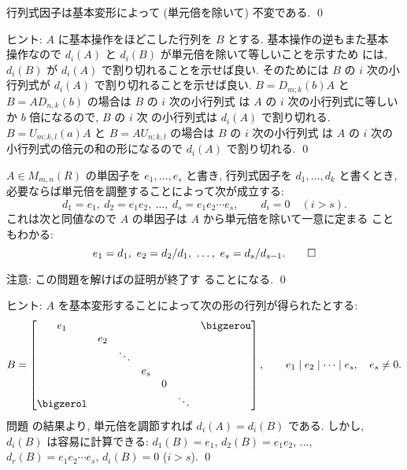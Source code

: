 \documentclass[12pt,twoside]{jarticle}
\begin{document}
\begin{question}[行列式因子の基本変形による不変性]
\label{q:invariance-det-div}
  行列式因子は基本変形によって (単元倍を除いて) 不変である.
  \qed
\end{question}

\noindent
ヒント: $A$ に基本操作をほどこした行列を $B$ とする. 基本操作の逆もまた基本
操作なので $d_i(A)$ と $d_i(B)$ が単元倍を除いて等しいことを示すため
には, $d_i(B)$ が $d_i(A)$ で割り切れることを示せば良い.  
そのためには $B$ の $i$ 次の小行列式が $d_i(A)$ で割り切れることを示せば良い.
$B=D_{m;k}(b)A$ と $B=AD_{n,k}(b)$ の場合は $B$ の $i$ 次の小行列式
は $A$ の $i$ 次の小行列式に等しいか $b$ 倍になるので, $B$ の $i$ 次
の小行列式は $d_i(A)$ で割り切れる.
$B=U_{m;k,l}(a)A$ と $B=AU_{n;k,l}$ の場合は $B$ の $i$ 次の小行列式
は $A$ の $i$ 次の小行列式の倍元の和の形になるので $d_i(A)$ で割り切れる.
\qed


\begin{question}[単因子と行列式因子の関係]
\label{q:elem-div-det-div}
  $A\in M_{m,n}(R)$ の単因子を $e_1,\dots,e_s$ と書き, 
  行列式因子を $d_1,\dots,d_k$ と書くとき, 
  必要ならば単元倍を調整することによって次が成立する:
  \begin{equation*}
    d_1 = e_1,\ d_2 = e_1e_2,\ \dots,\ d_s = e_1e_2\cdots e_s,
    \qquad
    d_i = 0 \quad (i>s).
  \end{equation*}
  これは次と同値なので $A$ の単因子は $A$ から単元倍を除いて一意に定まる
  こともわかる:
  \begin{equation*}
    e_1 = d_1,\ e_2 = d_2/d_1,\ \ldots,\ e_s = d_s/d_{s-1}.
  \qed
  \end{equation*}
\end{question}

\noindent
注意: この問題を解けばの証明が終了す
ることになる.
\qed

\medskip
\noindent
ヒント: $A$ を基本変形することによって次の形の行列が得られたとする:
\begin{equation*}
  B =
  \begin{bmatrix}
    e_1 &     &        &     &   & & \bigzerou \\
        & e_2 &        &     &   & & \\
        &     & \ddots &     &   & & \\
        &     &        & e_s &   & & \\
        &     &        &     & 0 & & \\
    \bigzerol & &      &     &   & \ddots & \\
  \end{bmatrix},
  \qquad
  e_1\mid e_2\mid\cdots\mid e_s, \quad
  e_s\ne 0.
\end{equation*}
問題  の結果より, 
単元倍を調節すれば $d_i(A)=d_i(B)$ である. 
しかし, $d_i(B)$ は容易に計算できる: %
$d_1(B) = e_1$, $d_2(B) = e_1e_2$, $\ldots$, $d_r(B) = e_1e_2\cdots e_s$,
$d_i(B) = 0$ ($i>s$).
\qed
\end{document}
